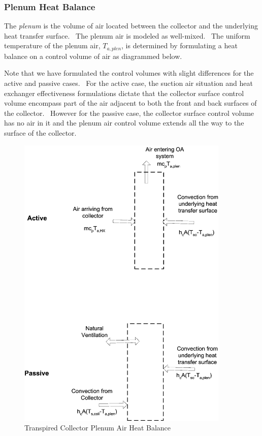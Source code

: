 \subsubsection{Plenum Heat Balance}\label{plenum-heat-balance}

The \emph{plenum} is the volume of air located between the collector and the underlying heat transfer surface.~ The plenum air is modeled as well-mixed.~ The uniform temperature of the plenum air, \({T_{a,plen}}\), is determined by formulating a heat balance on a control volume of air as diagrammed below.

Note that we have formulated the control volumes with slight differences for the active and passive cases.~ For the active case, the suction air situation and heat exchanger effectiveness formulations dictate that the collector surface control volume encompass part of the air adjacent to both the front and back surfaces of the collector.~ However for the passive case, the collector surface control volume has no air in it and the plenum air control volume extends all the way to the surface of the collector.

\begin{figure}[hbtp] %
\centering
\includegraphics[width=0.9\textwidth, height=0.9\textheight, keepaspectratio=true]{media/image6664.png}
\caption{Transpired Collector Plenum Air Heat Balance \protect \label{fig:transpired-collector-plenum-air-heat-balance}}
\end{figure}

